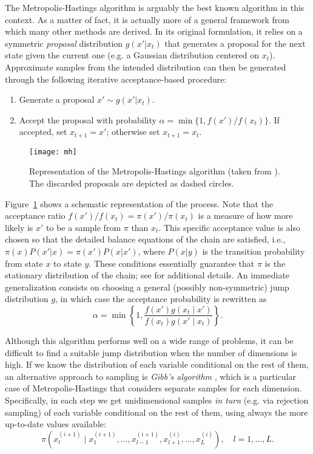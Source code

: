 The Metropolis-Hastings algorithm \citep{metropolis1953equation} is arguably the best known algorithm in this context. As a matter of fact, it is actually more of a general framework from which many other methods are derived. In its original formulation, it relies on a symmetric \textit{proposal} distribution \(g(x'|x_t)\) that generates a proposal for the next state given the current one (e.g. a Gaussian distribution centered on \(x_t\)). Approximate samples from the intended distribution can then be generated through the following iterative acceptance-based procedure:
\begin{enumerate}[1.]
  \item Generate a proposal \(x' \sim g(x'|x_t)\).
  \item Accept the proposal with probability \(\alpha=\min\{1, f(x')/f(x_t)\}\). If accepted, set \(x_{t+1}=x'\); otherwise set \(x_{t+1}=x_t\).
\end{enumerate}
 \begin{figure}[ht!]
   \centering
   \texttt{[image: mh]}
   \caption{Representation of the Metropolis-Hastings algorithm (taken from \citet{jaewook2015metamodel}). The discarded proposals are depicted as dashed circles.}\label{fig:mh}
 \end{figure}
Figure~\ref{fig:mh} shows a schematic representation of the process. Note that the acceptance ratio \(f(x')/f(x_t)=\pi(x')/\pi(x_t)\) is a measure of how more likely is \(x'\) to be a sample from \(\pi\) than \(x_t\). This specific acceptance value is also chosen so that the detailed balance equations of the chain are satisfied, i.e., \(\pi(x)P(x'|x)=\pi(x')P(x|x')\), where \(P(x|y)\) is the transition probability from state \(x\) to state \(y\). These conditions essentially guarantee that \(\pi\) is the stationary distribution of the chain; see \citet{robert1999monte} for additional details. An immediate generalization consists on choosing a general (possibly non-symmetric) jump distribution \(g\), in which case the acceptance probability is rewritten as
\[
\alpha = \min\left\{1, \frac{f(x')g(x_t \mid x')}{f(x_t)g(x'\mid x_t)}\right\}.
\]

Although this algorithm performs well on a wide range of problems, it can be difficult to find a suitable jump distribution when the number of dimensions is high. If we know the distribution of each variable conditional on the rest of them, an alternative approach to sampling is \textit{Gibb's algorithm} \citep{geman1984stochastic}, which is a particular case of Metropolis-Hastings that considers separate samples for each dimension. Specifically, in each step we get unidimensional samples \textit{in turn} (e.g. via rejection sampling) of each variable conditional on the rest of them, using always the more up-to-date values available:
\[
\pi(x_l^{(i+1)} \mid x_{1}^{(i+1)}, \dots, x_{l-1}^{(i+1)}, x_{l+1}^{(i)}, \dots, x_L^{(i)}), \quad l=1,\dots,L.
\]

